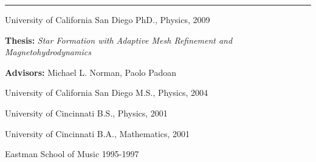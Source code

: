
\rule[3pt]{398.5pt}{.1mm}

\medskip
\noindent 
University of California San Diego
\hfill
PhD., Physics, 2009

\smallskip
{\bf Thesis: }{\it Star Formation with Adaptive Mesh Refinement and Magnetohydrodynamics}

\smallskip
{\bf Advisors: } Michael L. Norman, Paolo Padoan

\medskip
\noindent 
University of California San Diego
\hfill
M.S., Physics, 2004

\medskip
\noindent 
University of Cincinnati
\hfill
B.S., Physics, 2001

\medskip
\noindent 
University of Cincinnati
\hfill
B.A., Mathematics, 2001

\medskip
\noindent 
Eastman School of Music
\hfill
1995-1997

